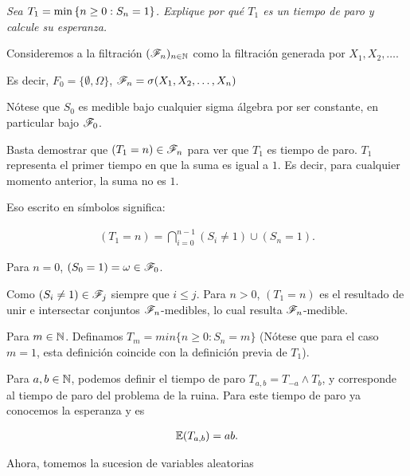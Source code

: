 \emph
{
	Sea $T_1=\min\left\{ n\geq 0:S_n=1\right\} $. Explique por qu\'e $T_1$ es un 
	tiempo de paro y calcule su esperanza.
}

\afterstatement\par\null

	Consideremos a la filtración $(\mathscr{F}_n)_{n\in\mathbb{N}}$ como la filtración 
	generada por $X_1, X_2, \dots$.\par\null

	Es decir, $F_0 = \{\emptyset, \Omega\}$, $\mathscr{F}_n = \sigma(X_1, X_2, \dots, X_n)$\par\null

	Nótese que $S_0$ es medible bajo cualquier sigma álgebra por ser constante, en particular bajo
	$\mathscr{F}_0$.\par\null

	Basta demostrar que $(T_1 = n) \in \mathscr{F}_n$ para ver que $T_1$ es tiempo de paro. $T_1$ 
	representa el primer tiempo en que la suma es igual a $1$. Es decir, para cualquier 
	momento anterior, la suma no es $1$.\par\null

	Eso escrito en símbolos significa:

    \begin{align}
        (T_1 = n) = \bigcap_{i=0}^{n-1}(S_i \not= 1) \cup (S_n = 1).
    \end{align}\par\null

	Para $n=0$, $(S_0 = 1) = \omega \in \mathscr{F}_0$.\par\null

	Como $(S_i \not= 1) \in \mathscr{F}_j$ siempre que $i \leq j$. Para $n>0$, $(T_1 = n)$ es el resultado de 
	unir e intersectar conjuntos $\mathscr{F}_n$-medibles, lo cual resulta $\mathscr{F}_n$-medible.\par\null

	Para $m \in \mathbb{N}$. Definamos $T_m = min\{n \geq 0 : S_n = m\}$ 
	(Nótese que para el caso $m=1$, esta definición	coincide con la definición previa de $T_1$).\par\null
	
	Para $a,b \in \mathbb{N}$, podemos definir el tiempo de paro $T_{a,b} = T_{-a} \wedge T_b$, y 
	corresponde al 	tiempo de paro del problema de la ruina. Para este tiempo de paro ya conocemos 
	la esperanza y es
	
    \begin{align}
        \mathbb{E}(T_{a,b}) = ab.
    \end{align}\par\null
	
	Ahora, tomemos la sucesion de variables aleatorias
    
